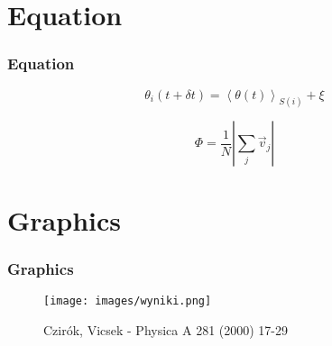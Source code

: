 \documentclass{beamer}
\begin{document}
\section{Equation}
\begin{frame}
	\frametitle{Equation}
	\begin{equation}
	\theta_i(t + \delta t) = \left< \theta (t) \right> _{S(i)} + \xi
	\end{equation}
	
	\begin{equation}
	\Phi = \frac{1}{N} \left| \sum_j \vec{v}_j \right|
	\end{equation}
\end{frame}

\section{Graphics}
\begin{frame}
	\frametitle{Graphics}
	\begin{figure}[H]
	\caption{Czirók, Vicsek - Physica A 281 (2000) 17-29}
	\texttt{[image: images/wyniki.png]}
	\end{figure}	
\end{frame}
\end{document}
